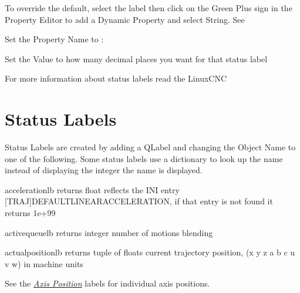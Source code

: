 \documentclass[letterpaper,10pt,english]{sphinxmanual}
\begin{document}
\sphinxAtStartPar
To override the default, select the label then click on the Green Plus sign
in the Property Editor to add a Dynamic Property and select String.
See {\hyperref[\detokenize{property::doc}]{}}


\sphinxAtStartPar
Set the Property Name to :


\sphinxAtStartPar
Set the Value to how many decimal places you want for that status label


\sphinxAtStartPar
For more information about status labels read the LinuxCNC 


\section{Status Labels}
\label{\detokenize{labels:id1}}
\sphinxAtStartPar
Status Labels are created by adding a QLabel and changing the Object Name to one
of the following. Some status labels use a dictionary to look up the name instead
of displaying the integer the name is displayed.

\begin{sphinxVerbatim}[commandchars=\\\{\}]
acceleration\PYGZus{}lb \PYGZhy{} returns float
reflects the INI entry [TRAJ]DEFAULT\PYGZus{}LINEAR\PYGZus{}ACCELERATION, if that entry is not
found it returns 1e+99

active\PYGZus{}queue\PYGZus{}lb \PYGZhy{} returns integer
number of motions blending

actual\PYGZus{}position\PYGZus{}lb \PYGZhy{} returns tuple of floats
current trajectory position, (x y z a b c u v w) in machine units
\end{sphinxVerbatim}

\sphinxAtStartPar
See the {\hyperref[\detokenize{labels:axis-position-labels}]{\emph{Axis Position}}} labels for individual axis
positions.
\end{document}
